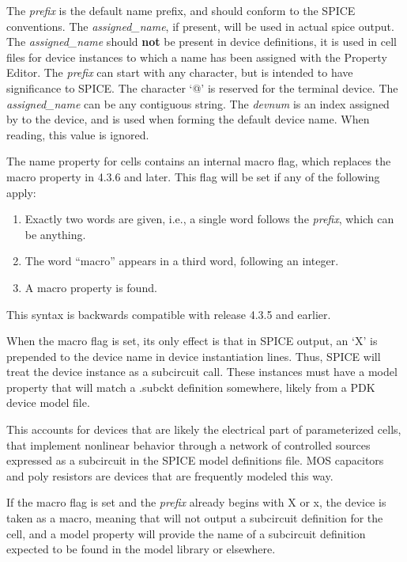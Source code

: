 \begin{description}
The {\it prefix} is the default name prefix, and should conform to the
SPICE conventions.  The {\it assigned\_name\/}, if present, will be
used in actual spice output.  The {\it assigned\_name} should {\bf
not} be present in device definitions, it is used in cell files for
device instances to which a name has been assigned with the {\cb
Property Editor}.  The {\it prefix} can start with any character, but
is intended to have significance to SPICE.  The character `{\vt @}' is
reserved for the terminal device.  The {\it assigned\_name\/} can be
any contiguous string.  The {\it devnum} is an index assigned by
{\Xic} to the device, and is used when forming the default device
name.  When reading, this value is ignored.

The {\et name} property for cells contains an internal {\vt macro}
flag, which replaces the {\et macro} property in 4.3.6 and later. 
This flag will be set if any of the following apply:
\begin{enumerate}
\item{Exactly two words are given, i.e., a single word follows the
{\it prefix\/}, which can be anything.}

\item{The word ``{\vt macro}'' appears in a third word, following an
integer.}

\item{A {\et macro} property is found.}
\end{enumerate}
This syntax is backwards compatible with release 4.3.5 and earlier.

When the {\vt macro} flag is set, its only effect is that in SPICE
output, an `{\vt X}' is prepended to the device name in device
instantiation lines.  Thus, SPICE will treat the device instance as a
subcircuit call.  These instances must have a {\et model} property
that will match a {\vt .subckt} definition somewhere, likely from a
PDK device model file.

This accounts for devices that are likely the electrical part of
parameterized cells, that implement nonlinear behavior through a
network of controlled sources expressed as a subcircuit in the SPICE
model definitions file.  MOS capacitors and poly resistors are devices
that are frequently modeled this way.

If the {\vt macro} flag is set and the {\it prefix} already begins
with {\vt X} or {\vt x}, the device is taken as a macro, meaning that
{\Xic} will not output a subcircuit definition for the cell, and a
{\et model} property will provide the name of a subcircuit definition
expected to be found in the model library or elsewhere.


\end{description}
